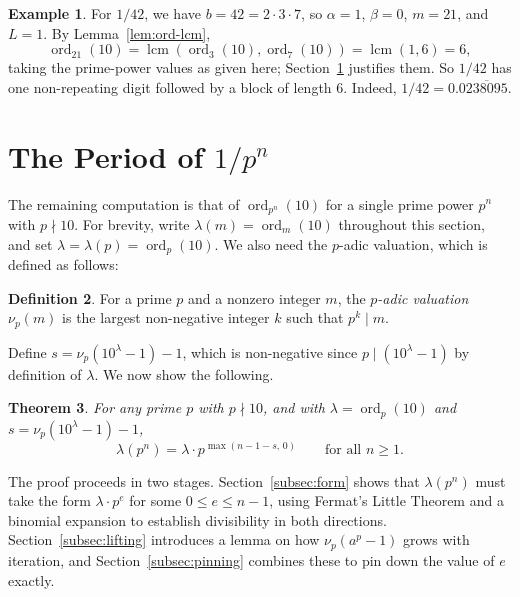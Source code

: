 \documentclass[12pt]{amsart}
\newtheorem{theorem}{Theorem}[section]
\theoremstyle{definition}
\newtheorem{definition}[theorem]{Definition}
\newtheorem{example}[theorem]{Example}
\theoremstyle{remark}
\newcommand{\ord}{\operatorname{ord}}
\newcommand{\lcm}{\operatorname{lcm}}
\begin{document}
\begin{example}\label{ex:1-over-42}
For $1/42$, we have $b = 42 = 2 \cdot 3 \cdot 7$, so $\alpha = 1$, 
$\beta = 0$, $m = 21$, and $L = 1$. By Lemma~\ref{lem:ord-lcm},
\[
  \ord_{21}(10) = \lcm(\ord_3(10), \ord_7(10)) = \lcm(1, 6) = 6,
\]
taking the prime-power values as given here; 
Section~\ref{sec:prime-power} justifies them. So $1/42$ has one 
non-repeating digit followed by a block of length $6$. Indeed, 
$1/42 = 0.0\overline{238095}$.
\end{example}


\section{The Period of $1/p^n$}\label{sec:prime-power}

The remaining computation is that of $\ord_{p^n}(10)$ for a single 
prime power $p^n$ with $p \nmid 10$. For brevity, write 
$\lambda(m) = \ord_m(10)$ throughout this section, and set 
$\lambda = \lambda(p) = \ord_p(10)$. We also need the $p$-adic 
valuation, which is defined as follows:

\begin{definition}\label{def:p-adic}
For a prime $p$ and a nonzero integer $m$, the \emph{$p$-adic valuation} 
$\nu_p(m)$ is the largest non-negative integer $k$ such that $p^k \mid m$.
\end{definition}
Define $s = \nu_p(10^\lambda - 1) - 1$, which is non-negative since 
$p \mid (10^\lambda - 1)$ by definition of $\lambda$.
We now show the following.

\begin{theorem}\label{thm:prime-power-period}
For any prime $p$ with $p \nmid 10$, and with $\lambda = \ord_p(10)$ 
and $s = \nu_p(10^\lambda - 1) - 1$,
\[
  \lambda(p^n) = \lambda \cdot p^{\max(n - 1 - s,\, 0)} 
  \qquad \text{for all } n \ge 1.
\]
\end{theorem}

The proof proceeds in two stages. Section~\ref{subsec:form} shows that 
$\lambda(p^n)$ must take the form $\lambda \cdot p^e$ for some 
$0 \le e \le n - 1$, using Fermat's Little Theorem and a binomial 
expansion to establish divisibility in both directions. 
Section~\ref{subsec:lifting} introduces a lemma on how $\nu_p(a^p - 1)$ 
grows with iteration, and Section~\ref{subsec:pinning} combines these to 
pin down the value of $e$ exactly. 
\end{document}
